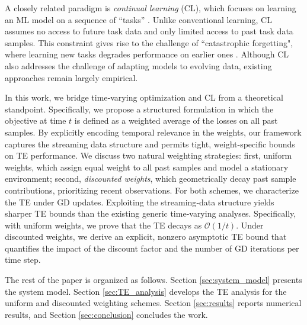 \documentclass[conference]{IEEEtran}
\begin{document}
A closely related paradigm is \emph{continual learning} (CL), which focuses on learning an ML model on a sequence of ``tasks'' \cite{Learn_without_forget,CL_Review,CL_Survey,CL_Survey_Defy_Forget}. Unlike conventional learning, CL assumes no access to future task data and only limited access to past task data samples. This constraint gives rise to the challenge of ``catastrophic forgetting", where learning new tasks degrades performance on earlier ones \cite{Catastrophic_McCloskey}. 
Although CL also addresses the challenge of adapting models to evolving data, existing approaches remain largely empirical.

In this work, we bridge time‐varying optimization and CL from a
theoretical standpoint. Specifically, we propose a structured
formulation in which the objective at time $t$ is defined as a
weighted average of the losses on all past samples. By explicitly
encoding temporal relevance in the weights, our framework captures the
streaming data structure and permits tight, weight-specific bounds on
TE performance. We discuss two natural weighting strategies: first, uniform weights, which assign equal weight to all past samples and model a stationary environment; second, \emph{discounted
weights}, which geometrically decay past sample contributions, prioritizing recent observations. For both schemes, we characterize the TE under GD updates. Exploiting the
streaming‐data structure yields sharper TE bounds than
the existing generic time‐varying analyses. Specifically, with uniform
weights, we prove that the TE decays as $\mathcal{O}(1/t)$. Under
discounted weights, we derive an explicit, nonzero asymptotic TE bound
that quantifies the impact of the discount factor and the number of GD
iterations per time step.

The rest of the paper is organized as follows. Section \ref{sec:system_model} presents the system model. Section \ref{sec:TE_analysis} develops the TE analysis for the uniform and discounted weighting schemes. Section \ref{sec:results} reports numerical results, and Section \ref{sec:conclusion} concludes the work.
\end{document}
